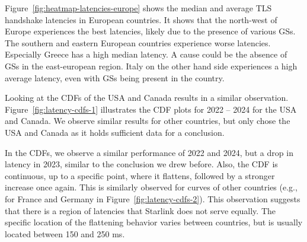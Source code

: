 Figure~\ref{fig:heatmap-latencies-europe} shows the median and average TLS
handshake latencies in European countries. It shows that the north-west of
Europe experiences the best latencies, likely due to the presence of various
\ac{GS}s. The southern and eastern European countries experience worse
latencies. Especially Greece has a high median latency. A cause could be the
absence of \ac{GS}s in the east-european region. Italy on the other hand side
experiences a high average latency, even with \ac{GS}s being present in the
country.

Looking at the CDFs of the USA and Canada results in a similar observation.
Figure~\ref{fig:latency-cdfs-1} illustrates the CDF plots for 2022 -- 2024
for the USA and Canada. We observe similar results for other countries, but
only chose the USA and Canada as it holds sufficient data for a conclusion.

In the CDFs, we observe a similar performance of 2022 and 2024, but a drop in
latency in 2023, similar to the conclusion we drew before. Also, the CDF is continuous, up to a specific point, where it flattens, followed by a stronger increase once again. This is similarly observed for curves of other countries (e.g., for France and Germany in Figure~\ref{fig:latency-cdfs-2}). This observation suggests that there is a region of latencies that Starlink does not serve equally. The specific location of the flattening behavior varies between countries, but is usually located between 150 and 250 ms.

